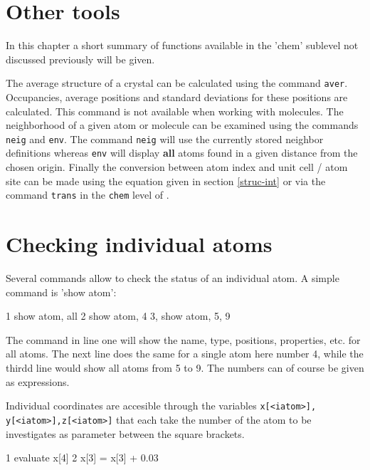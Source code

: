 \section{Other tools \label{chem-other}}

In this chapter a short summary of functions available in the 'chem'
sublevel not discussed previously will be given. \par

The average structure of a crystal can be calculated using the
command {\tt aver}. Occupancies, average positions and standard
deviations for these positions are calculated. This command is not
available when working with molecules. The neighborhood of a given
atom or molecule can be examined using the commands {\tt neig} and
{\tt env}. The command {\tt neig} will use the currently stored
neighbor definitions whereas {\tt env} will display {\bf all} atoms
found in a given distance from the chosen origin. Finally the
conversion between atom index and unit cell / atom site can be made
using the equation given in section \ref{struc-int} or via the
command {\tt trans} in the {\tt chem} level of \discus.



\section{Checking individual atoms \label{chem-indiv}}

Several commands allow to check the status of an individual atom.
A simple command is 'show atom':

\begin{MacVerbatim}
 1 show atom, all
 2 show atom, 4
 3, show atom, 5, 9
\end{MacVerbatim}

The command in line one will show the name, type, positions, properties,
etc. for all atoms. The next line does the same for a single atom here number 4,
while the thirdd line would show all atoms from 5 to 9. The numbers can of 
course be given as expressions.

Individual coordinates are accesible through the variables {\tt x[<iatom>], 
y[<iatom>],z[<iatom>]}
that each take the number of the atom to be investigates as parameter between the 
square brackets.
\begin{MacVerbatim}
 1 evaluate x[4]
 2 x[3] = x[3] + 0.03
\end{MacVerbatim}

